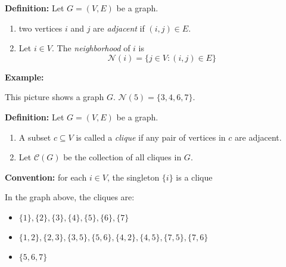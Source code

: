 \documentclass[12pt]{article}
\begin{document}
        \textbf{Definition:} Let $G = (V, E)$ be a graph.
        \begin{enumerate}
            \item two vertices $i$ and $j$ are \emph{adjacent} if $(i, j) \in E$.
            \item Let $i \in V$. The \emph{neighborhood} of $i$ is 
            \[\mathcal{N}(i) = \{j \in V: (i, j) \in E\}\]
        \end{enumerate}


        \textbf{Example:}
        \begin{center}
        \end{center}
        
        This picture shows a graph $G$. $\mathcal{N}(5) = \{3, 4, 6, 7\}$. 

        \textbf{Definition:} Let $G = (V, E)$ be a graph. 
        \begin{enumerate}
            \item A subset $c \subseteq V$ is called a \emph{clique} if any pair of vertices in $c$ are adjacent. 
            \item Let $\mathcal{C}(G)$ be the collection of all cliques in $G$.
        \end{enumerate}

        \textbf{Convention:} for each $i \in V$, the singleton $\{i\}$ is a clique

        In the graph above, the cliques are: 
        \begin{itemize}
            \item $\{1\}, \{2\}, \{3\}, \{4\}, \{5\}, \{6\}, \{7\}$
            \item $\{1, 2\}, \{2, 3\}, \{3, 5\}, \{5, 6\}, \{4, 2\}, \{4, 5\}, \{7, 5\}, \{7, 6\}$
            \item $\{5, 6, 7\}$
        \end{itemize}
\end{document}
